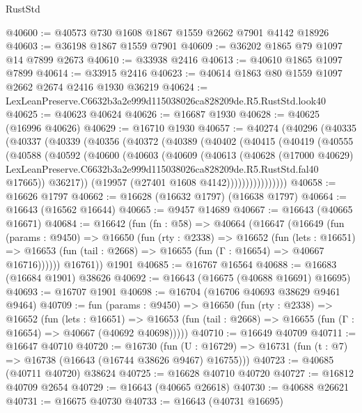 \begin{lexlean}{RustStd}
\begin{coremodule}
@40600 := @40573 @730 @1608 @1867 @1559 @2662 @7901 @4142 @18926
@40603 := @36198 @1867 @1559 @7901
@40609 := @36202 @1865 @79 @1097 @14 @7899 @2673
@40610 := @33938 @2416
@40613 := @40610 @1865 @1097 @7899
@40614 := @33915 @2416
@40623 := @40614 @1863 @80 @1559 @1097 @2662 @2674 @2416 @1930 @36219
@40624 := LexLeanPreserve.C6632b3a2e999d115038026ca828209de.R5.RustStd.look40
@40625 := @40623 @40624
@40626 := @16687 @1930
@40628 := @40625 (@16996 @40626)
@40629 := @16710 @1930
@40657 := @40274
    (@40296
      (@40335
        (@40337
          (@40339
            (@40356
              (@40372
                (@40389
                  (@40402
                    (@40415
                      (@40419
                        (@40555
                          (@40588
                            (@40592
                              (@40600
                                (@40603
                                  (@40609
                                    (@40613
                                      (@40628
                                        (@17000 @40629)
                                        LexLeanPreserve.C6632b3a2e999d115038026ca828209de.R5.RustStd.fal40
                                        @17665))
                                    @36217))
                                (@19957 (@27401 @1608 @4142))))))))))))))))
@40658 := @16626 @1797
@40662 := @16628 (@16632 @1797) (@16638 @1797)
@40664 := @16643 (@16562 @16644)
@40665 := @9457 @14689
@40667 := @16643 (@40665 @16671)
@40684 := @16642
    (fun (fn : @58) =>
    @40664
      (@16647
        (@16649
          (fun (params : @9450) =>
          @16650
            (fun (rty : @2338) =>
            @16652
              (fun (lets : @16651) =>
              @16653 (fun (tail : @2668) => @16655 (fun (Γ : @16654) => @40667 @16716))))))
        @16761))
    @1901
@40685 := @16767 @16564
@40688 := @16683 (@16684 @1901) @38626
@40692 := @16643 (@16675 (@40688 @16691) @16695)
@40693 := @16707 @1901
@40698 := @16704 (@16706 @40693 @38629 @9461 @9464)
@40709 := fun (params : @9450) =>
  @16650
    (fun (rty : @2338) =>
    @16652
      (fun (lets : @16651) =>
      @16653 (fun (tail : @2668) => @16655 (fun (Γ : @16654) => @40667 (@40692 @40698)))))
@40710 := @16649 @40709
@40711 := @16647 @40710
@40720 := @16730
    (fun (U : @16729) => @16731 (fun (t : @7) => @16738 (@16643 (@16744 @38626 @9467) @16755)))
@40723 := @40685 (@40711 @40720) @38624
@40725 := @16628 @40710 @40720
@40727 := @16812 @40709 @2654
@40729 := @16643 (@40665 @26618)
@40730 := @40688 @26621
@40731 := @16675 @40730
@40733 := @16643 (@40731 @16695)

\end{coremodule}
\end{lexlean}
